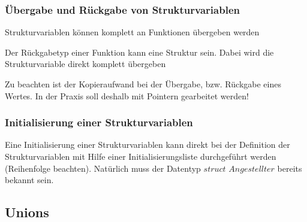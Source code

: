 		\subsubsection{Übergabe und Rückgabe von Strukturvariablen}
			\begin{compactitem}
				\item Strukturvariablen können komplett an Funktionen übergeben werden
				\item Der Rückgabetyp einer Funktion kann eine Struktur sein. Dabei wird die Strukturvariable direkt komplett übergeben
				\item Zu beachten ist der Kopieraufwand bei der Übergabe, bzw. Rückgabe eines Wertes. In der Praxis soll deshalb mit Pointern gearbeitet werden!
				 
			\end{compactitem}
		\newpage
		\subsubsection{Initialisierung einer Strukturvariablen}
			Eine Initialisierung einer Strukturvariablen kann direkt bei der Definition der Strukturvariablen mit Hilfe einer Initialisierungsliste durchgeführt werden (Reihenfolge beachten). Natürlich muss der Datentyp $struct$ $Angestellter$ bereits bekannt sein. 
			 				
	\subsection{Unions}
